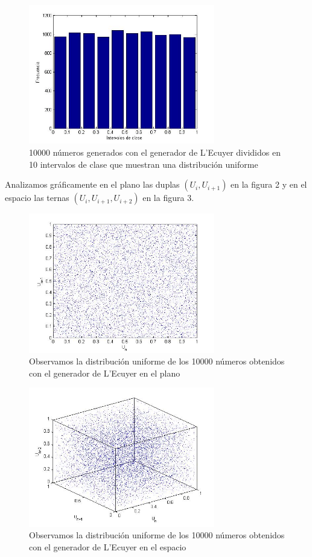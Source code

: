 \documentclass[10pt,journal,compsoc]{IEEEtran}
\begin{document}
\begin{figure}[t]
\label{fig:histogramalecuyer}
\begin{center}
\centering
\includegraphics[width=3.2in]{clases.jpg}
\caption{10000 n\'umeros generados con el generador de L'Ecuyer divididos en 10 intervalos de clase que muestran una distribuci\'on uniforme}
\end{center}
\end{figure}

Analizamos gr\'aficamente en el plano las duplas $(U_i, U_{i+1})$ en la figura 2 y en el espacio las ternas $(U_i, U_{i+1}, U_{i+2})$ en la figura 3.

\begin{figure}[t]
\label{fig:2d}
\begin{center}
\centering
\includegraphics[width=3.2in]{2d_groso.jpg}
\caption{Observamos la distribuci\'on uniforme de los 10000 n\'umeros obtenidos con el generador de L'Ecuyer en el plano}
\end{center}
\end{figure}

\begin{figure}[t]
\label{fig:3d}
\begin{center}
\centering
\includegraphics[width=3.2in]{3d.jpg}
\caption{Observamos la distribuci\'on uniforme de los 10000 n\'umeros obtenidos con el generador de L'Ecuyer en el espacio}
\end{center}
\end{figure}
\end{document}

